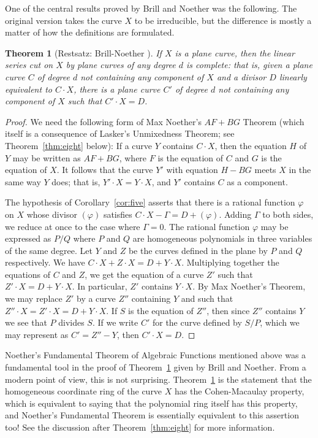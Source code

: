 \documentclass{bull-l}
\newtheorem{thm}[prop]{Theorem}
\theoremstyle{pplain}
\theoremstyle{definition}
\begin{document}
One of the central results proved by Brill and Noether was the following.  The
original version takes the curve $X$ to be irreducible, but the difference is
mostly a matter of how the definitions are formulated.

\begin{thm}[Restsatz: Brill-Noether \cite{BN}] \label{thm:three}
If $X$ is a plane curve, then the linear series cut on $X$ by plane curves of
any degree $d$ is complete\textup{:} that is, given a plane curve $C$ of degree
$d$ not containing any component of $X$ and a divisor $D$ linearly equivalent
to $C\cdot X$, there is a plane curve $C'$ of degree $d$ not containing any 
component of $X$ such that $C'\cdot X=D$.
\end{thm}

\begin{proof}  %
We need the following form of Max Noether's $AF+BG$ Theorem (which itself is a
consequence of Lasker's Unmixedness Theorem; see Theorem~\ref{thm:eight}
below): If a curve $Y$ contains $C\cdot X$, then the equation $H$ of $Y$ may be
written as $AF+BG$, where $F$ is the equation of $C$ and $G$ is the equation of
$X$.  It follows that the curve $Y'$ with equation $H-BG$ meets $X$ in the same
way $Y$ does; that is, $Y'\cdot X=Y\cdot X$, and $Y'$ contains $C$ as a 
component.

The hypothesis of Corollary~\ref{cor:five} asserts that there is a rational 
function $\varphi$ on $X$ whose divisor $(\varphi)$ satisfies $C\cdot
X-\Gamma=D+(\varphi)$. Adding $\Gamma$ to both sides, we reduce at once to the
case where $\Gamma=0$.  The rational function $\varphi$ may be expressed as
$P/Q$ where $P$ and $Q$ are homogeneous polynomials in three variables of the
same degree.  Let $Y$ and $Z$ be the curves defined in the plane by $P$ and $Q$
respectively.  We have $C\cdot X+Z\cdot X=D+Y\cdot X$.  Multiplying together
the equations of $C$ and $Z$, we get the equation of a curve $Z'$ such that
$Z'\cdot  X=D+Y\cdot X$.  In particular, $Z'$ contains $Y\cdot X$.  By Max
Noether's Theorem, we may replace $Z'$ by a curve $Z''$ containing $Y$ and such
that $Z''\cdot X=Z'\cdot X=D+Y\cdot X$.  If $S$ is the equation of $Z''$, then
since $Z''$ contains $Y$ we see that $P$ divides $S$.  If we write $C'$ for the
curve defined by $S/P$, which we may represent as $C'=Z''-Y$, then $C'\cdot
X=D$.
\end{proof}

Noether's Fundamental Theorem of Algebraic Functions mentioned above was a
fundamental tool in the proof of Theorem~\ref{thm:three} given by Brill and
Noether.  From a modern point of view, this is not surprising. 
Theorem~\ref{thm:three} is the statement that the homogeneous coordinate ring
of the curve $X$ has the Cohen-Macaulay property, which is equivalent to saying
that the polynomial ring itself has this property, and Noether's Fundamental 
Theorem is essentially equivalent to this assertion too!  See the discussion
after Theorem~\ref{thm:eight} for more information.
\end{document}
